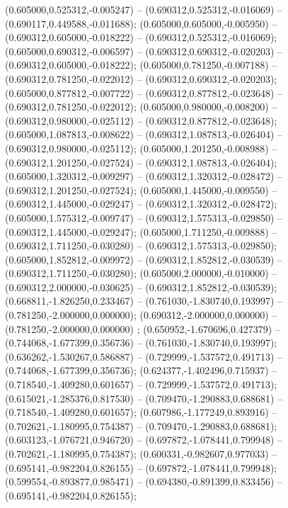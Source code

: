  (0.605000,0.525312,-0.005247) -- (0.690312,0.525312,-0.016069) -- (0.690117,0.449588,-0.011688);
 (0.605000,0.605000,-0.005950) -- (0.690312,0.605000,-0.018222) -- (0.690312,0.525312,-0.016069);
 (0.605000,0.690312,-0.006597) -- (0.690312,0.690312,-0.020203) -- (0.690312,0.605000,-0.018222);
 (0.605000,0.781250,-0.007188) -- (0.690312,0.781250,-0.022012) -- (0.690312,0.690312,-0.020203);
 (0.605000,0.877812,-0.007722) -- (0.690312,0.877812,-0.023648) -- (0.690312,0.781250,-0.022012);
 (0.605000,0.980000,-0.008200) -- (0.690312,0.980000,-0.025112) -- (0.690312,0.877812,-0.023648);
 (0.605000,1.087813,-0.008622) -- (0.690312,1.087813,-0.026404) -- (0.690312,0.980000,-0.025112);
 (0.605000,1.201250,-0.008988) -- (0.690312,1.201250,-0.027524) -- (0.690312,1.087813,-0.026404);
 (0.605000,1.320312,-0.009297) -- (0.690312,1.320312,-0.028472) -- (0.690312,1.201250,-0.027524);
 (0.605000,1.445000,-0.009550) -- (0.690312,1.445000,-0.029247) -- (0.690312,1.320312,-0.028472);
 (0.605000,1.575312,-0.009747) -- (0.690312,1.575313,-0.029850) -- (0.690312,1.445000,-0.029247);
 (0.605000,1.711250,-0.009888) -- (0.690312,1.711250,-0.030280) -- (0.690312,1.575313,-0.029850);
 (0.605000,1.852812,-0.009972) -- (0.690312,1.852812,-0.030539) -- (0.690312,1.711250,-0.030280);
 (0.605000,2.000000,-0.010000) -- (0.690312,2.000000,-0.030625) -- (0.690312,1.852812,-0.030539);
 (0.668811,-1.826250,0.233467) -- (0.761030,-1.830740,0.193997) -- (0.781250,-2.000000,0.000000);
 (0.690312,-2.000000,0.000000) -- (0.781250,-2.000000,0.000000) ;
 (0.650952,-1.670696,0.427379) -- (0.744068,-1.677399,0.356736) -- (0.761030,-1.830740,0.193997);
 (0.636262,-1.530267,0.586887) -- (0.729999,-1.537572,0.491713) -- (0.744068,-1.677399,0.356736);
 (0.624377,-1.402496,0.715937) -- (0.718540,-1.409280,0.601657) -- (0.729999,-1.537572,0.491713);
 (0.615021,-1.285376,0.817530) -- (0.709470,-1.290883,0.688681) -- (0.718540,-1.409280,0.601657);
 (0.607986,-1.177249,0.893916) -- (0.702621,-1.180995,0.754387) -- (0.709470,-1.290883,0.688681);
 (0.603123,-1.076721,0.946720) -- (0.697872,-1.078441,0.799948) -- (0.702621,-1.180995,0.754387);
 (0.600331,-0.982607,0.977033) -- (0.695141,-0.982204,0.826155) -- (0.697872,-1.078441,0.799948);
 (0.599554,-0.893877,0.985471) -- (0.694380,-0.891399,0.833456) -- (0.695141,-0.982204,0.826155);
